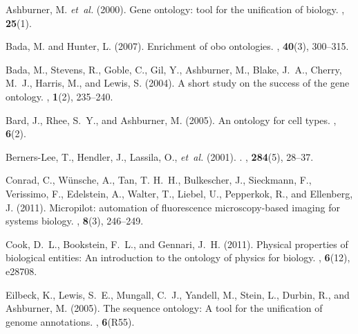 \documentclass{bioinfo}
\begin{document}
% 
\begin{thebibliography}{}

Ashburner, M. {\em et~al.} (2000).
\newblock Gene ontology: tool for the unification of biology.
, {\bf 25}(1).

Bada, M. and Hunter, L. (2007).
\newblock Enrichment of obo ontologies.
, {\bf 40}(3), 300--315.

Bada, M., Stevens, R., Goble, C., Gil, Y., Ashburner, M., Blake, J.~A., Cherry,
  M.~J., Harris, M., and Lewis, S. (2004).
\newblock A short study on the success of the gene ontology.
, {\bf 1}(2), 235--240.

Bard, J., Rhee, S.~Y., and Ashburner, M. (2005).
\newblock An ontology for cell types.
, {\bf 6}(2).

Berners-Lee, T., Hendler, J., Lassila, O., {\em et~al.} (2001).
.
, {\bf 284}(5), 28--37.

Conrad, C., W\"{u}nsche, A., Tan, T. H.~H., Bulkescher, J., Sieckmann, F.,
  Verissimo, F., Edelstein, A., Walter, T., Liebel, U., Pepperkok, R., and
  Ellenberg, J. (2011).
\newblock Micropilot: automation of fluorescence microscopy-based imaging for
  systems biology.
, {\bf 8}(3), 246--249.

Cook, D.~L., Bookstein, F.~L., and Gennari, J.~H. (2011).
\newblock Physical properties of biological entities: An introduction to the
  ontology of physics for biology.
, {\bf 6}(12), e28708.

Eilbeck, K., Lewis, S.~E., Mungall, C.~J., Yandell, M., Stein, L., Durbin, R.,
  and Ashburner, M. (2005).
\newblock The sequence ontology: A tool for the unification of genome
  annotations.
, {\bf 6}(R55).


\end{thebibliography}
\end{document}
